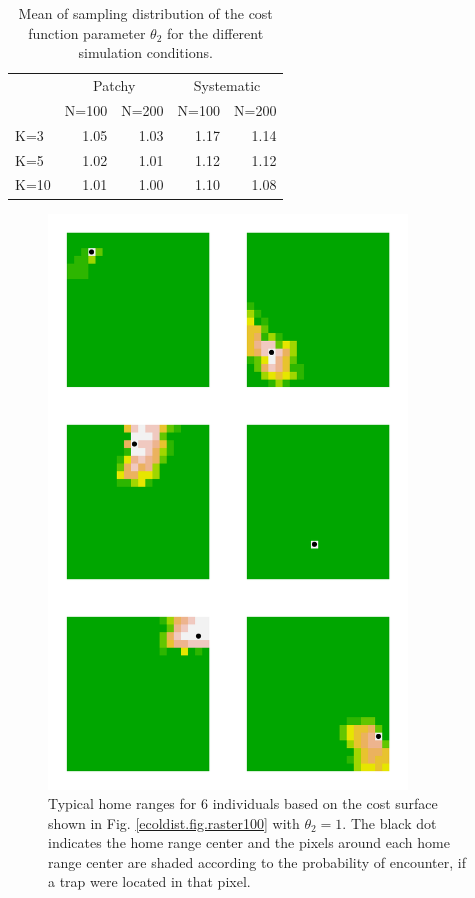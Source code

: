 \documentclass[12pt]{article}
\begin{document}
\begin{table}[ht]
\centering
\caption{
Mean of sampling distribution of the cost function parameter
$\theta_{2}$ for the different simulation
conditions. 
}
\begin{tabular}{l|rrrr}
 & \multicolumn{2}{c}{Patchy} & \multicolumn{2}{c}{Systematic} \\
    & N=100 &  N=200  &   N=100 &  N=200  \\ \hline
K=3 &   1.05&    1.03 &     1.17 & 1.14 \\
K=5 &   1.02&    1.01 &     1.12 &1.12 \\
K=10&   1.01&    1.00 &     1.10 &1.08 \\
\end{tabular}
\label{tab.results2}
\end{table}











\newpage



\begin{figure}
\begin{center}
\includegraphics[height=6in,width=3.75in]{figs/home_ranges}
\end{center}
\caption{
Typical home ranges for 6 individuals based on the cost surface shown in
  Fig. \ref{ecoldist.fig.raster100} with $\theta_{2}=1$. The black dot indicates the home
  range center and the pixels around each home range center are shaded
according to the probability of encounter, if a trap were located in
that pixel.
}
\label{fig.homeranges}
\end{figure}
\end{document}
